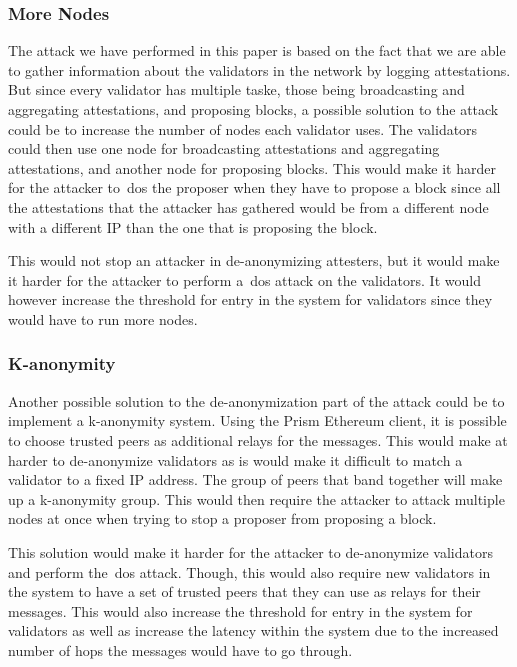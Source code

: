 \subsubsection{More Nodes}\label{subsubsec:more-nodes}
The attack we have performed in this paper is based on the fact that we are able to gather information about the validators in the network by logging attestations.
But since every validator has multiple taske, those being broadcasting and aggregating attestations, and proposing blocks, a possible solution to the attack could be to increase the number of nodes each validator uses.
The validators could then use one node for broadcasting attestations and aggregating attestations, and another node for proposing blocks.
This would make it harder for the attacker to~\gls{dos} the proposer when they have to propose a block since all the attestations that the attacker has gathered would be from a different node with a different IP than the one that is proposing the block.

This would not stop an attacker in de-anonymizing attesters, but it would make it harder for the attacker to perform a~\gls{dos} attack on the validators.
It would however increase the threshold for entry in the system for validators since they would have to run more nodes.

\subsubsection{K-anonymity}\label{subsubsec:k-anonymity}
Another possible solution to the de-anonymization part of the attack could be to implement a k-anonymity system.
Using the Prism Ethereum client, it is possible to choose trusted peers as additional relays for the messages.
This would make at harder to de-anonymize validators as is would make it difficult to match a validator to a fixed IP address.
The group of peers that band together will make up a k-anonymity group.
This would then require the attacker to attack multiple nodes at once when trying to stop a proposer from proposing a block.

This solution would make it harder for the attacker to de-anonymize validators and perform the~\gls{dos} attack.
Though, this would also require new validators in the system to have a set of trusted peers that they can use as relays for their messages.
This would also increase the threshold for entry in the system for validators as well as increase the latency within the system due to the increased number of hops the messages would have to go through.


